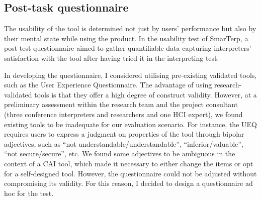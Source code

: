 \subsection{Post-task questionnaire}


The usability of the tool is determined not just by users’ performance but also by their mental state while using the product. In the usability test of SmarTerp, a post-test questionnaire aimed to gather quantifiable data capturing interpreters’ satisfaction with the tool after having tried it in the interpreting test.

In developing the questionnaire, I considered utilising pre-existing validated tools, such as the User Experience Questionnaire. The advantage of using re\-search\nobreakdash-val\-i\-dat\-ed tools is that they offer a high degree of construct validity. However, at a preliminary assessment within the research team and the project consultant (three conference interpreters and researchers and one HCI expert), we found existing tools to be inadequate for our evaluation scenario. For instance, the UEQ requires users to express a judgment on properties of the tool through bipolar adjectives, such as ``not understandable/understandable'', ``inferior/valuable'', ``not secure/secure'', etc. We found some adjectives to be ambiguous in the context of a CAI tool, which made it necessary to either change the items or opt for a self-designed tool. However, the questionnaire could not be adjusted without compromising its validity. For this reason, I decided to design a questionnaire ad hoc for the test.

